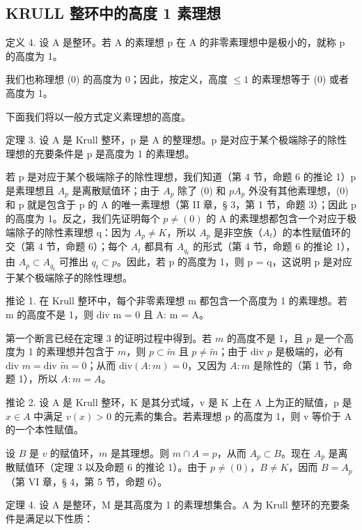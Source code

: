 \subsection{KRULL 整环中的高度 1 素理想}

定义 4. 设 A 是整环。若 A 的素理想 p 在 A 的非零素理想中是极小的，就称 p 的高度为 1。

我们也称理想 (0) 的高度为 0；因此，按定义，高度 \(\leqslant 1\) 的素理想等于 (0) 或者高度为 1。

下面我们将以一般方式定义素理想的高度。

定理 3. 设 A 是 Krull 整环，p 是 A 的整理想。p 是对应于某个极端除子的除性理想的充要条件是 p 是高度为 1 的素理想。

若 p 是对应于某个极端除子的除性理想，我们知道（第 4 节，命题 6 的推论 1）p 是素理想且 \(A_{p}\) 是离散赋值环；由于 \(A_{p}\) 除了 (0) 和 \(pA_{p}\) 外没有其他素理想，(0) 和 p 就是包含于 p 的 A 的唯一素理想（第 II 章，§ 3，第 1 节，命题 3）；因此 p 的高度为 1。反之，我们先证明每个 \(p \neq (0)\) 的 A 的素理想都包含一个对应于极端除子的除性素理想 q：因为 \(A_{p} \neq K\)，所以 \(A_{p}\) 是非空族（\(A_{t}\)）的本性赋值环的交（第 4 节，命题 6）；每个 \(A_{t}\) 都具有 \(A_{q_{t}}\) 的形式（第 4 节，命题 6 的推论 1），由 \(A_{p} \subset A_{q_{t}}\) 可推出 \(q_{t} \subset p\)。因此，若 p 的高度为 1，则 p = q，这说明 p 是对应于某个极端除子的除性理想。

推论 1. 在 Krull 整环中，每个非零素理想 m 都包含一个高度为 1 的素理想。若 m 的高度不是 1，则 div m = 0 且 A: m = A。

第一个断言已经在定理 3 的证明过程中得到。若 \(m\) 的高度不是 1，且 \(p\) 是一个高度为 1 的素理想并包含于 \(m\)，则 \(p \subset \tilde{m}\) 且 \(p \neq \tilde{m}\)；由于 \(\text{div } p\) 是极端的，必有 \(\text{div } m = \text{div } \tilde{m} = 0\)；从而 \(\text{div}(A: m) = 0\)，又因为 \(A: m\) 是除性的（第 1 节，命题 1），所以 \(A: m = A\)。

推论 2. 设 A 是 Krull 整环，K 是其分式域，v 是 K 上在 A 上为正的赋值，p 是 \(x \in A\) 中满足 \(v(x) > 0\) 的元素的集合。若素理想 p 的高度为 1，则 v 等价于 A 的一个本性赋值。

设 \(B\) 是 \(v\) 的赋值环，\(m\) 是其理想。则 \(m \cap A = p\)，从而 \(A_p \subset B\)。现在 \(A_p\) 是离散赋值环（定理 3 以及命题 6 的推论 1）。由于 \(p \neq (0)\)，\(B \neq K\)，因而 \(B = A_p\)（第 VI 章，§ 4，第 5 节，命题 6）。

定理 4. 设 A 是整环，M 是其高度为 1 的素理想集合。A 为 Krull 整环的充要条件是满足以下性质：

